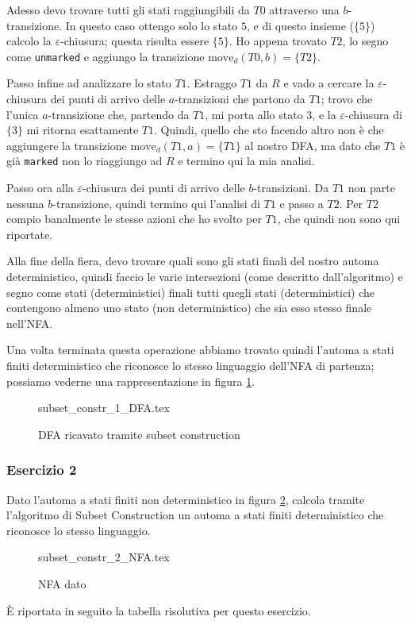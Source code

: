 \documentclass[class=book, crop=false, oneside, 12pt]{standalone}
\begin{document}
Adesso devo trovare tutti gli stati raggiungibili da \(T0\) attraverso una \(b\)-transizione. In questo caso ottengo solo lo stato \(5\), e di questo insieme (\(\{5\}\)) calcolo la \(\varepsilon\)-chiusura; questa risulta essere \(\{5\}\). Ho appena trovato \(T2\), lo segno come \texttt{unmarked} e aggiungo la transizione \(\textrm{move}_d(T0, b)=\{T2\}\).

Passo infine ad analizzare lo stato \(T1\). Estraggo \(T1\) da \(R\) e vado a cercare la \(\varepsilon\)-chiusura dei punti di arrivo delle \(a\)-transizioni che partono da \(T1\); trovo che l'unica \(a\)-transizione che, partendo da \(T1\), mi porta allo stato \(3\), e la \(\varepsilon\)-chiusura di \(\{3\}\) mi ritorna esattamente \(T1\). Quindi, quello che sto facendo altro non è che aggiungere la transizione \(\textrm{move}_d(T1, a)=\{T1\}\) al nostro DFA, ma dato che \(T1\) è già \texttt{marked} non lo riaggiungo ad \(R\) e termino qui la mia analisi.

Passo ora alla \(\varepsilon\)-chiusura dei punti di arrivo delle \(b\)-transizioni. Da \(T1\) non parte nessuna \(b\)-transizione, quindi termino qui l'analisi di \(T1\) e passo a \(T2\).
Per \(T2\) compio banalmente le stesse azioni che ho svolto per \(T1\), che quindi non sono qui riportate.

Alla fine della fiera, devo trovare quali sono gli stati finali del nostro automa deterministico, quindi faccio le varie intersezioni (come descritto dall'algoritmo) e segno come stati (deterministici) finali tutti quegli stati (deterministici) che contengono almeno uno stato (non deterministico) che sia esso stesso finale nell'NFA.

Una volta terminata questa operazione abbiamo trovato quindi l’automa a stati finiti deterministico che riconosce lo stesso linguaggio dell’NFA di partenza; possiamo vederne una rappresentazione in figura \ref{sol_sc_1}.
\begin{figure}[H]
    \centering
    {subset_constr_1_DFA.tex}
    \caption{DFA ricavato tramite subset construction}
    \label{sol_sc_1}
\end{figure}


\subsubsection*{Esercizio 2}
Dato l'automa a stati finiti non deterministico in figura \ref{es_sc_2}, calcola tramite l'algoritmo di Subset Construction un automa a stati finiti deterministico che riconosce lo stesso linguaggio.
\begin{figure}[H]
    \centering
    {subset_constr_2_NFA.tex}
    \caption{NFA dato}
    \label{es_sc_2}
\end{figure}
È riportata in seguito la tabella risolutiva per questo esercizio.\\
\end{document}

